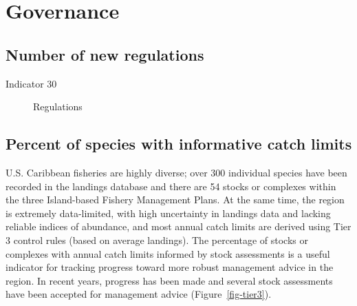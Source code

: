 \documentclass[
  letterpaper,
  oneside,
  open=any]{scrbook}
\begin{document}
\section{Governance}\label{governance}

\subsection{Number of new regulations}\label{number-of-new-regulations}

Indicator 30

\begin{figure}


\caption{\label{fig-FR}Regulations}

\end{figure}%

\subsection{Percent of species with informative catch
limits}\label{percent-of-species-with-informative-catch-limits}

U.S. Caribbean fisheries are highly diverse; over 300 individual species
have been recorded in the landings database and there are 54 stocks or
complexes within the three Island-based Fishery Management Plans. At the
same time, the region is extremely data-limited, with high uncertainty
in landings data and lacking reliable indices of abundance, and most
annual catch limits are derived using Tier 3 control rules (based on
average landings). The percentage of stocks or complexes with annual
catch limits informed by stock assessments is a useful indicator for
tracking progress toward more robust management advice in the region. In
recent years, progress has been made and several stock assessments have
been accepted for management advice (Figure~\ref{fig-tier3}).
\end{document}
